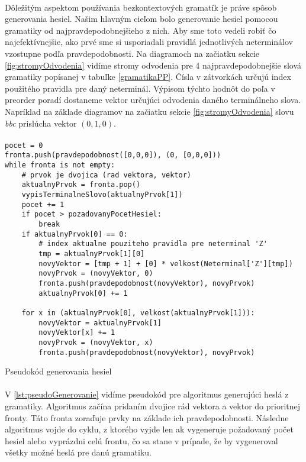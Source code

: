 \paragraph{}
Dôležitým aspektom používania bezkontextových gramatík je práve spôsob generovania hesiel. Našim hlavným cieľom bolo generovanie hesiel pomocou gramatiky od najpravdepodobnejšieho z nich. Aby sme toto vedeli robiť čo najefektívnejšie, ako prvé sme si usporiadali pravidlá jednotlivých neterminálov vzostupne podľa pravdepodobnosti. Na diagramoch na začiatku sekcie \ref{fig:stromyOdvodenia} vidíme stromy odvodenia pre 4 najpravdepodobnejšie slová gramatiky popísanej v tabuľke \ref{gramatikaPP}. Čísla v zátvorkách určujú index použitého pravidla pre daný neterminál. Výpisom týchto hodnôt do poľa v preorder poradí dostaneme vektor určujúci odvodenia daného terminálneho slova. Napríklad na základe diagramov na začiatku sekcie \ref{fig:stromyOdvodenia} slovu \emph{bbc} prislúcha vektor \((0,1,0)\).

\paragraph{}
\begin{listing}
\begin{verbatim}
pocet = 0
fronta.push(pravdepodobnost([0,0,0]), (0, [0,0,0]))
while fronta is not empty:
	# prvok je dvojica (rad vektora, vektor)
	aktualnyPrvok = fronta.pop()
	vypisTerminalneSlovo(aktualnyPrvok[1])
	pocet += 1
	if pocet > pozadovanyPocetHesiel:
		break
	if aktualnyPrvok[0] == 0:
		# index aktualne pouziteho pravidla pre neterminal 'Z'
		tmp = aktualnyPrvok[1][0]
		novyVektor = [tmp + 1] + [0] * velkost(Neterminal['Z'][tmp])
		novyPrvok = (novyVektor, 0)
		fronta.push(pravdepodobnost(novyVektor), novyPrvok)
		aktualnyPrvok[0] += 1

	for x in (aktualnyPrvok[0], velkost(aktualnyPrvok[1])):
		novyVektor = aktualnyPrvok[1]
		novyVektor[x] += 1
		novyPrvok = (novyVektor, x)
		fronta.push(pravdepodobnost(novyVektor), novyPrvok)
\end{verbatim}
\caption{Pseudokód generovania hesiel}
\label{lst:pseudoGenerovanie}
\end{listing}

\paragraph{}
V \ref{lst:pseudoGenerovanie} vidíme pseudokód pre algoritmus generujúci heslá z gramatiky. Algoritmus začína pridaním dvojice rád vektora a vektor do prioritnej fronty. Táto fronta zoraďuje prvky na základe ich pravdepodobnosti. Následne algoritmus vojde do cyklu, z ktorého vyjde len ak vygeneruje požadovaný počet hesiel alebo vyprázdni celú frontu, čo sa stane v prípade, že by vygeneroval všetky možné heslá pre danú gramatiku.

